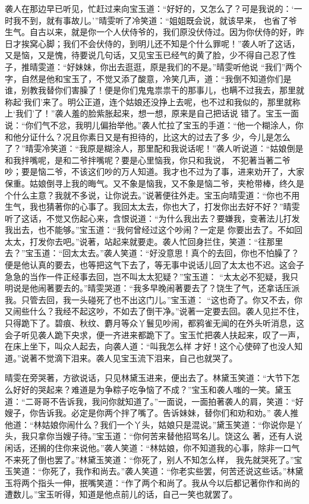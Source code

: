 \begin{parag}
    袭人在那边早已听见，忙赶过来向宝玉道：“好好的，又怎么了？可是我说的：‘一时我不到，就有事故儿。’”晴雯听了冷笑道：“姐姐既会说，就该早来， 也省了爷生气。自古以来，就是你一个人伏侍爷的，我们原没伏侍过。因为你伏侍的好，昨日才挨窝心脚；我们不会伏侍的，到明儿还不知是个什么罪呢！”袭人听了这话，又是恼，又是愧，待要说几句话，又见宝玉已经气的黄了脸，少不得自己忍了性子，推晴雯道：“好妹妹，你出去逛逛，原是我们的不是。”晴雯听他说 “我们”两个字，自然是他和宝玉了，不觉又添了酸意，冷笑几声，道：“我倒不知道你们是谁，别教我替你们害臊了！便是你们鬼鬼祟祟干的那事儿，也瞒不过我去，那里就称起‘我们’来了。明公正道，连个姑娘还没挣上去呢，也不过和我似的，那里就称上‘我们’了！”袭人羞的脸紫胀起来，想一想，原来是自己把话说 错了。宝玉一面说：“你们气不忿，我明儿偏抬举他。”袭人忙拉了宝玉的手道：“他一个糊涂人，你和他分证什么？况且你素日又是有担待的，比这大的过去了多 少，今儿是怎么了？”晴雯冷笑道：“我原是糊涂人，那里配和我说话呢！”袭人听说道：“姑娘倒是和我拌嘴呢，是和二爷拌嘴呢？要是心里恼我，你只和我说， 不犯著当著二爷吵；要是恼二爷，不该这们吵的万人知道。我才也不过为了事，进来劝开了，大家保重。姑娘倒寻上我的晦气。又不象是恼我，又不象是恼二爷，夹枪带棒，终久是个什么主意？我就不多说，让你说去。”说著便往外走。宝玉向晴雯道：“你也不用生气，我也猜著你的心事了。我回太太去，你也大了，打发你出去好不好？”晴雯听了这话，不觉又伤起心来，含恨说道：“为什么我出去？要嫌我，变著法儿打发我出去，也不能够。”宝玉道：“我何曾经过这个吵闹？一定是 你要出去了。不如回太太，打发你去吧。”说著，站起来就要走。袭人忙回身拦住，笑道：“往那里去？”宝玉道：“回太太去。”袭人笑道：“好没意思！真个的去回，你也不怕臊了？便是他认真的要去，也等把这气下去了，等无事中说话儿回了太太也不迟。这会子急急的当作一件正经事去回，岂不叫太太犯疑？”宝玉道： “太太必不犯疑，我只明说是他闹著要去的。”晴雯哭道：“我多早晚闹著要去了？饶生了气，还拿话压派我。只管去回，我一头碰死了也不出这门儿。”宝玉道： “这也奇了。你又不去，你又闹些什么？我经不起这吵，不如去了倒干净。”说著一定要去回。袭人见拦不住，只得跪下了。碧痕、秋纹、麝月等众丫鬟见吵闹，都鸦雀无闻的在外头听消息，这会子听见袭人跪下央求，便一齐进来都跪下了。宝玉忙把袭人扶起来，叹了一声，在床上坐下，叫众人起去，向袭人道：“叫我怎么样 才好！这个心使碎了也没人知道。”说著不觉滴下泪来。袭人见宝玉流下泪来，自己也就哭了。
\end{parag}


\begin{parag}
    晴雯在旁哭著，方欲说话，只见林黛玉进来，便出去了。林黛玉笑道：“大节下怎么好好的哭起来？难道是为争粽子吃争恼了不成？”宝玉和袭人嗤的一笑。黛玉道：“二哥哥不告诉我，我问你就知道了。”一面说，一面拍著袭人的肩，笑道：“好嫂子，你告诉我。必定是你两个拌了嘴了。告诉妹妹，替你们和劝和劝。” 袭人推他道：“林姑娘你闹什么？我们一个丫头，姑娘只是混说。”黛玉笑道：“你说你是丫头，我只拿你当嫂子待。”宝玉道：“你何苦来替他招骂名儿。饶这么 著，还有人说闲话，还搁的住你来说他。”袭人笑道：“林姑娘，你不知道我的心事，除非一口气不来死了倒也罢了。”林黛玉笑道：“你死了，别人不知怎么样， 我先就哭死了。”宝玉笑道：“你死了，我作和尚去。”袭人笑道：“你老实些罢，何苦还说这些话。”林黛玉将两个指头一伸，抿嘴笑道：“作了两个和尚了。我从今以后都记著你作和尚的遭数儿。”宝玉听得，知道是他点前儿的话，自己一笑也就罢了。
\end{parag}


